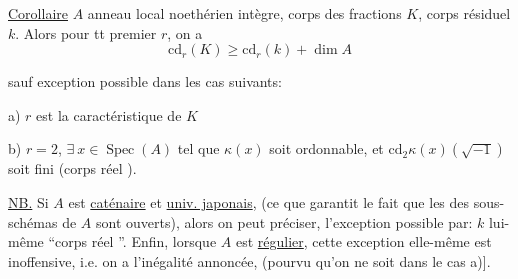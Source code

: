 \uline{Corollaire} $A$ anneau local  noethérien
intègre, corps des fractions $K$, corps résiduel $k$.
Alors pour tt premier $r$, on a
\[
\mathrm{cd}_r(K)\geq\mathrm{cd}_r(k)+\dim A
\]

sauf exception possible dans les cas suivants:

a) $r$ est la caractéristique de $K$

b) $r=2$, 
$\exists\ x\in\operatorname{Spec}(A)$ tel que $\kappa(x)$
soit ordonnable, et $\mathrm{cd}_2\kappa(x)(\sqrt{-1})$ soit fini
(corps réel ).

\uline{NB.} Si $A$ est \uline{caténaire} et \uline{univ. japonais},
(ce que garantit le fait que les 
des sous-schémas de $A$ sont ouverts), alors
 on peut préciser,  l'exception
possible par: $k$ lui-même ``corps réel ''.
Enfin, lorsque $A$ est \uline{régulier},
cette exception elle-même est inoffensive, i.e.
on a l'inégalité annoncée, (pourvu qu'on ne
soit dans le cas a)].

